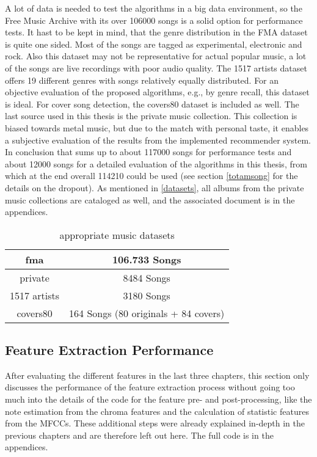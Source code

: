 A lot of data is needed to test the algorithms in a big data environment, so the Free Music Archive with its over 106000 songs is a solid option for performance tests. It hast to be kept in mind, that the genre distribution in the FMA dataset is quite one sided. Most of the songs are tagged as experimental, electronic and rock. Also this dataset may not be representative for actual popular music, a lot of the songs are live recordings with poor audio quality.%
The 1517 artists dataset offers 19 different genres with songs relatively equally distributed. For an objective evaluation of the proposed algorithms, e.g., by genre recall, this dataset is ideal. For cover song detection, the covers80 dataset is included as well.
The last source used in this thesis is the private music collection. This collection is biased towards metal music, but due to the match with personal taste, it enables a subjective evaluation of the results from the implemented recommender system.\\ 
In conclusion that sums up to about 117000 songs for performance tests and about 12000 songs for a detailed evaluation of the algorithms in this thesis, from which at the end overall 114210 could be used (see section \ref{totamsong} for the details on the dropout). As mentioned in \ref{datasets}, all albums from the private music collections are cataloged as well, and the associated document is in the appendices. 

\begin{table}[h]
	\label{used_dsets}
	\begin{center}
		\begin{tabular}{|c||c|}
			\hline
			fma & 106.733 Songs\\
			\hline
			private & 8484 Songs\\
			\hline
			1517 artists & 3180 Songs\\
			\hline
			covers80 & 164 Songs (80 originals + 84 covers)\\
			\hline
		\end{tabular}
	\end{center}
	\caption{appropriate music datasets}
\end{table}
\FloatBarrier

\subsection{Feature Extraction Performance}

After evaluating the different features in the last three chapters, this section only discusses the performance of the feature extraction process without going too much into the details of the code for the feature pre- and post-processing, like the note estimation from the chroma features and the calculation of statistic features from the MFCCs. These additional steps were already explained in-depth in the previous chapters and are therefore left out here. The full code is in the appendices. 

